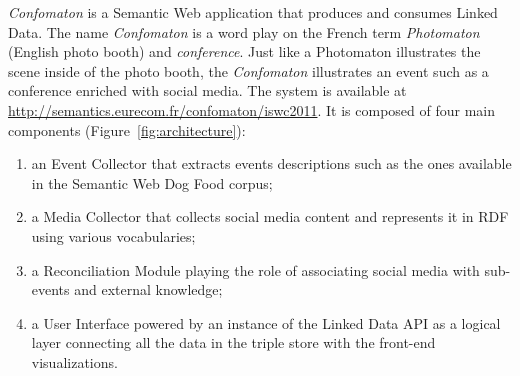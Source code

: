 \begin{table}[htbp]
\end{table}

\emph{Confomaton} is a Semantic Web application that produces and consumes Linked Data. The name \emph{Confomaton} is a word play on the French term \emph{Photomaton} (English photo booth) and \emph{conference}. Just like a Photomaton illustrates the scene inside of the photo booth, the \emph{Confomaton} illustrates an event such as a conference enriched with social media. The system is available at \url{http://semantics.eurecom.fr/confomaton/iswc2011}. It is composed of four main components (Figure~\ref{fig:architecture}):
\begin{enumerate}
\item an Event Collector that extracts events descriptions such as the ones available in the Semantic Web Dog Food corpus;
 \item a Media Collector that collects social media content and represents it in RDF using various vocabularies;
 \item  a Reconciliation Module playing the role of associating social media with sub-events and external knowledge;
  \item a User Interface powered by an instance of the Linked Data API as a logical layer connecting all the data in the triple store with the front-end visualizations.
\end{enumerate}



